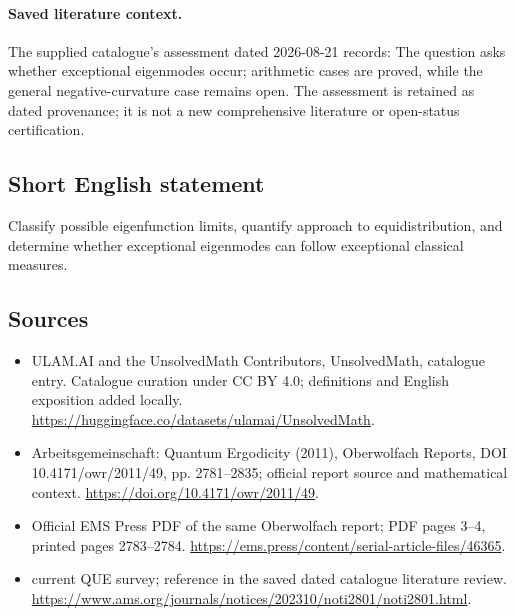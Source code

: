 \documentclass[11pt]{article}
\begin{document}
\paragraph{Saved literature context.} The supplied catalogue's assessment dated 2026-08-21 records: The question asks whether exceptional eigenmodes occur; arithmetic cases are proved, while the general negative-curvature case remains open. The assessment is retained as dated provenance; it is not a new comprehensive literature or open-status certification.
\subsection{Short English statement}
Classify possible eigenfunction limits, quantify approach to equidistribution, and determine whether exceptional eigenmodes can follow exceptional classical measures.
\subsection{Sources}
\begin{itemize}
\item[\hypertarget{source:statement:1}{S1}] ULAM.AI and the UnsolvedMath Contributors, UnsolvedMath, catalogue entry. Catalogue curation under CC BY 4.0; definitions and English exposition added locally.
\url{https://huggingface.co/datasets/ulamai/UnsolvedMath}.
\item[\hypertarget{source:statement:2}{S2}] Arbeitsgemeinschaft: Quantum Ergodicity (2011), Oberwolfach Reports, DOI 10.4171/owr/2011/49, pp. 2781--2835; official report source and mathematical context.
\url{https://doi.org/10.4171/owr/2011/49}.
\item[\hypertarget{source:statement:3}{S3}] Official EMS Press PDF of the same Oberwolfach report; PDF pages 3--4, printed pages 2783--2784.
\url{https://ems.press/content/serial-article-files/46365}.
\item[\hypertarget{source:statement:4}{S4}] current QUE survey; reference in the saved dated catalogue literature review.
\url{https://www.ams.org/journals/notices/202310/noti2801/noti2801.html}.
\end{itemize}
\label{end:statement}
\end{document}
